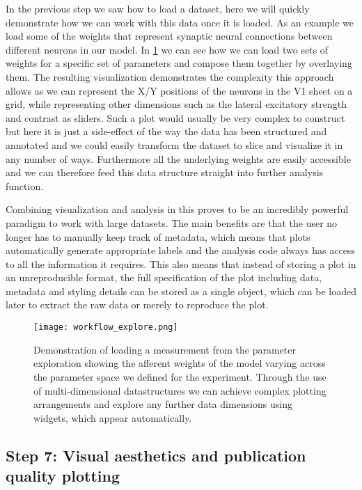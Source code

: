 In the previous step we saw how to load a dataset, here we will
quickly demonstrate how we can work with this data once it is loaded.
As an example we load some of the weights that represent synaptic
neural connections between different neurons in our model. In
\ref{workflow_explore} we can see how we can load two sets of weights
for a specific set of parameters and compose them together by
overlaying them. The resulting visualization demonstrates the
complexity this approach allows as we can represent the X/Y positions
of the neurons in the V1 sheet on a grid, while representing other
dimensions such as the lateral excitatory strength and contrast as
sliders. Such a plot would usually be very complex to construct but
here it is just a side-effect of the way the data has been structured
and annotated and we could easily transform the dataset to slice and
visualize it in any number of ways. Furthermore all the underlying
weights are easily accessible and we can therefore feed this data
structure straight into further analysis function.

Combining visualization and analysis in this proves to be an
incredibly powerful paradigm to work with large datasets. The main
benefits are that the user no longer has to manually keep track of
metadata, which means that plots automatically generate appropriate
labels and the analysis code always has access to all the information
it requires. This also means that instead of storing a plot in an
unreproducible format, the full specification of the plot including
data, metadata and styling details can be stored as a single object,
which can be loaded later to extract the raw data or merely to
reproduce the plot.

\begin{figure}
	\centering
        \texttt{[image: workflow\_explore.png]}
	\caption[Demonstration of complex parameter exploration in
      HoloViews.]{Demonstration of loading a measurement from the
      parameter exploration showing the afferent weights of the model
      varying across the parameter space we defined for the
      experiment. Through the use of multi-dimensional datastructures
      we can achieve complex plotting arrangements and explore any
      further data dimensions using widgets, which appear
      automatically.}
	\label{workflow_explore}
\end{figure}

\subsection{Step 7: Visual aesthetics and publication quality plotting}

